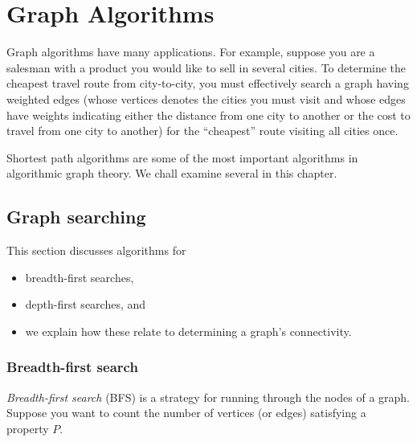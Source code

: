 
\chapter{Graph Algorithms}
\label{chap:graph_algorithms}

Graph algorithms have many applications. For example,
suppose you are a salesman with a product you would like to sell
in several cities. To determine the cheapest travel route from
city-to-city, you must effectively search a graph
having weighted edges (whose vertices denotes the cities you must
visit and whose edges have weights
indicating either the distance from one city to
another or the cost to travel from one city to another)
for the ``cheapest'' route visiting all cities once.

Shortest path algorithms are some of the most important algorithms in
algorithmic graph theory.
We chall examine several in this chapter.


\section{Graph searching}

This section discusses algorithms for 

\begin{itemize}
\item 
breadth-first searches,

\item 
depth-first searches, and

\item 
we explain how these relate to determining a graph's connectivity.
\end{itemize}

\subsection{Breadth-first search} 

{\it Breadth-first search} (BFS) is a strategy for running through the
nodes of a graph. Suppose you want to count the number of
vertices (or edges) satisfying a property $P$.

